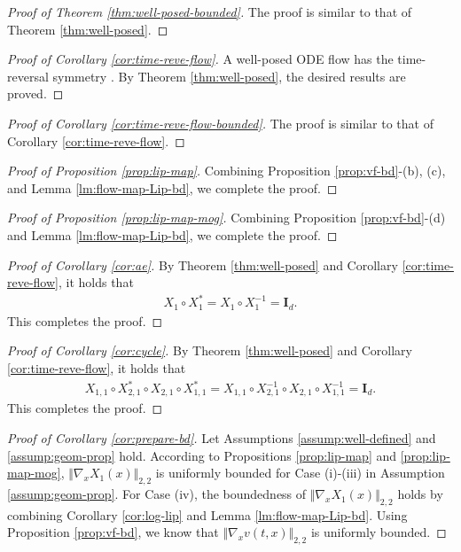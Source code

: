 \documentclass[twoside,11pt]{article}
\def\rmI{{\mathbf{I}}}
\numberwithin{equation}{section}
\begin{document}
\begin{proof} [Proof of Theorem \ref{thm:well-posed-bounded}]
The proof is similar to that of Theorem \ref{thm:well-posed}.
\end{proof}

\begin{proof} [Proof of Corollary \ref{cor:time-reve-flow}]
    A well-posed ODE flow has the time-reversal symmetry \citep{lamb1998time}. By Theorem \ref{thm:well-posed}, the desired results are proved.
\end{proof}

\begin{proof} [Proof of Corollary \ref{cor:time-reve-flow-bounded}]
    The proof is similar to that of Corollary \ref{cor:time-reve-flow}.
\end{proof}

\begin{proof} [Proof of Proposition \ref{prop:lip-map}]
    Combining Proposition \ref{prop:vf-bd}-(b), (c), and Lemma \ref{lm:flow-map-Lip-bd}, we complete the proof.
\end{proof}


\begin{proof} [Proof of Proposition \ref{prop:lip-map-mog}]
    Combining Proposition \ref{prop:vf-bd}-(d) and Lemma \ref{lm:flow-map-Lip-bd}, we complete the proof.
\end{proof}


\begin{proof} [Proof of Corollary \ref{cor:ae}]
    By Theorem \ref{thm:well-posed} and Corollary \ref{cor:time-reve-flow}, it holds that
    \begin{align*}
        X_1 \circ X_1^* = X_1 \circ X_1^{-1} = \rmI_d.
    \end{align*}
    This completes the proof.
\end{proof}


\begin{proof} [Proof of Corollary \ref{cor:cycle}]
    By Theorem \ref{thm:well-posed} and Corollary \ref{cor:time-reve-flow}, it holds that
    \begin{align*}
        X_{1, 1} \circ X_{2, 1}^* \circ X_{2, 1} \circ X_{1, 1}^* = X_{1, 1} \circ X_{2, 1}^{-1} \circ X_{2, 1} \circ X_{1, 1}^{-1} = \rmI_d.
    \end{align*}
    This completes the proof.
\end{proof}


\begin{proof} [Proof of Corollary \ref{cor:prepare-bd}]
    Let Assumptions \ref{assump:well-defined} and \ref{assump:geom-prop} hold.
    According to Propositions \ref{prop:lip-map} and \ref{prop:lip-map-mog}, $\Vert \nabla_x X_1(x) \Vert_{2,2}$ is uniformly bounded for Case (i)-(iii) in Assumption \ref{assump:geom-prop}. For Case (iv), the boundedness of $\Vert \nabla_x X_1(x) \Vert_{2,2}$ holds by combining Corollary \ref{cor:log-lip} and Lemma \ref{lm:flow-map-Lip-bd}.
    Using Proposition \ref{prop:vf-bd}, we know that $\Vert \nabla_x v(t, x) \Vert_{2,2}$ is uniformly bounded.
\end{proof}
\end{document}
